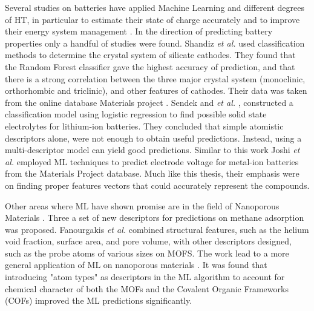 Several studies on batteries have applied Machine Learning and different degrees of HT, in particular to estimate their state of charge accurately and to improve their energy system management  \cite{kalawoun2015novel} \cite{chemali2018state} \cite{hu2015battery} \cite{ermon2013learning}.
	In the direction of predicting battery properties only a handful of studies were found. Shandiz \textit{et al.} \cite{shandiz2016application} used classification methods to determine the crystal system of silicate cathodes. They found that the Random Forest classifier gave the highest accuracy of prediction, and that there is a strong correlation between the three major crystal system (monoclinic, orthorhombic and triclinic), and other features of cathodes. Their data was taken from the online database Materials project \cite{Jain2013} \cite{Zhou2004a} \cite{Adams2011a}.
	Sendek and \textit{et al.} \cite{sendek2017holistic}, constructed a classification model using logistic regression to find possible solid state electrolytes for lithium-ion batteries. They concluded that simple atomistic descriptors alone, were not enough to obtain useful predictions. Instead, using a multi-descriptor model can yield good predictions.
	Similar to this work Joshi \textit{et al.} \cite{joshi2019machine} employed ML techniques to predict electrode voltage for metal-ion batteries from the Materials Project database. Much like this thesis, their emphasis were on finding proper features vectors that could accurately represent the compounds.

Other areas where ML have shown promise are in the field of Nanoporous Materials \cite{fanourgakis2019robust}. Three a set of new descriptors for predictions on methane adsorption was proposed. Fanourgakis \textit{et al.} combined structural features, such as the helium void fraction, surface area, and pore volume, with other descriptors designed, such as the probe atoms of various sizes on MOFS. The work lead to a more general application of ML on nanoporous materials \cite{fanourgakis2020universal}. It was found that introducing "atom types" as descriptors in the ML algorithm to account for chemical character of both the MOFs and the Covalent Organic Frameworks (COFs) improved the ML predictions significantly. 
